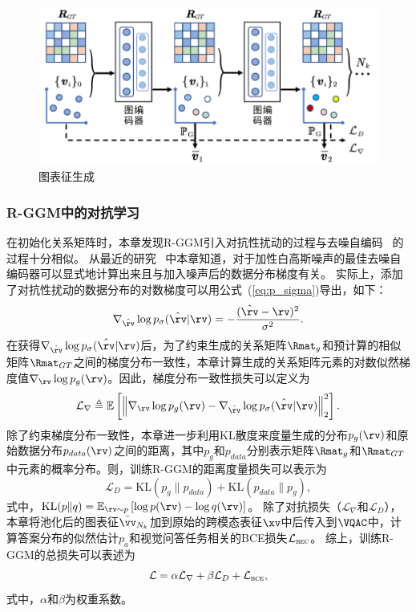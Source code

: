 \begin{figure}[!t]
\centering
\includegraphics[width=0.85\linewidth]{figure/c3_Rep_GGM.pdf}
\caption{图表征生成}
\label{fig:c3_Rep_GGM}
\end{figure}

\subsubsection{R-GGM中的对抗学习}
在初始化关系矩阵时，本章发现R-GGM引入对抗性扰动的过程与去噪自编码~\cite{vincent2008extracting} 的过程十分相似。
从最近的研究~\cite{bigdeli2020learning} 中本章知道，对于加性白高斯噪声的最佳去噪自编码器可以显式地计算出来且与加入噪声后的数据分布梯度有关。
实际上，添加了对抗性扰动的数据分布的对数梯度可以用公式~(\ref{eq:p_sigma})导出，如下：
\begin{equation}
\nabla_{\hat{\rv}}\log p_{\sigma}(\hat{\rv}|\rv) = -\frac{(\hat{\rv} - \rv)^2}{\sigma^2}. 
\end{equation} 
在获得$\nabla_{\hat{\rv}}\log p_{\sigma}(\hat{\rv}|\rv)$后，为了约束生成的关系矩阵$\Rmat_g$和预计算的相似矩阵$\Rmat_{GT}$之间的梯度分布一致性，本章计算生成的关系矩阵元素的对数似然梯度值$\nabla_{\rv}\log p_g(\rv)$。因此，梯度分布一致性损失可以定义为
\begin{equation} 
\mathcal{L}_{\nabla} \triangleq  \mathbb{E}\left[\left\| \nabla_{\rv}\log p_g(\rv) - \nabla_{\hat{\rv}}\log p_{\sigma}(\hat{\rv}|\rv) \right\|_2^2\right]. 
\label{eq:L_G}
\end{equation} 
除了约束梯度分布一致性，本章进一步利用KL散度来度量生成的分布$p_g(\rv)$和原始数据分布$p_{data}(\rv)$之间的距离，其中$p_g$和$p_{data}$分别表示矩阵$\Rmat_g$和$\Rmat_{GT}$ 中元素的概率分布。则，训练R-GGM的距离度量损失可以表示为
\begin{equation}
\mathcal{L}_D = \mathrm{KL}(p_g \| p_{data}) + \mathrm{KL}(p_{data} \| p_g), 
\label{eq:L_D}
\end{equation}
式中，$\mathrm{KL}(p\|q)=\mathbb{E}_{\rv \sim p}\left[\log p(\rv) - \log q(\rv)\right]$。
除了对抗损失（$\mathcal{L}_{\nabla}$和$\mathcal{L}_{D}$），本章将池化后的图表征$\bar{\vv}_{N_k}$加到原始的跨模态表征$\xv$中后传入到$\VQAC$中，计算答案分布的似然估计$p_{a}$和视觉问答任务相关的BCE损失$\mathcal{L}_{\textsc{bec}}$。
综上，训练R-GGM的总损失可以表述为
\begin{equation}
\mathcal{L} = \alpha \mathcal{L}_{\nabla} + \beta \mathcal{L}_D + \mathcal{L}_{\textsc{bce}}, 
\label{eq:c3_L_total}
\end{equation} 
式中，$\alpha$和$\beta$为权重系数。


